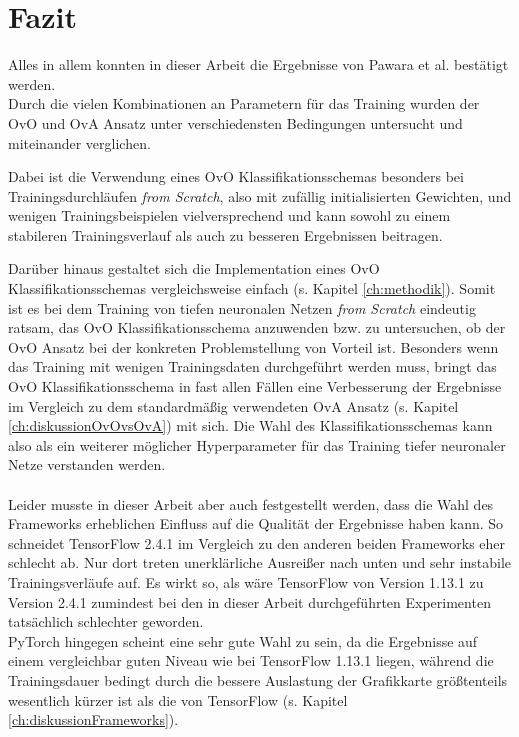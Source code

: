 \chapter{Fazit}
\label{ch:fazit}
Alles in allem konnten in dieser Arbeit die Ergebnisse von Pawara et al. \cite{pawaraPaper} bestätigt werden.\\
Durch die vielen Kombinationen an Parametern für das Training wurden der OvO und OvA Ansatz unter verschiedensten Bedingungen untersucht und miteinander verglichen.

Dabei ist die Verwendung eines OvO Klassifikationsschemas besonders bei Trainingsdurchläufen \textit{from Scratch}, also mit zufällig initialisierten Gewichten, und wenigen Trainingsbeispielen vielversprechend und kann sowohl zu einem stabileren Trainingsverlauf als auch zu besseren Ergebnissen beitragen.

Darüber hinaus gestaltet sich die Implementation eines OvO Klassifikationsschemas vergleichsweise einfach (s. Kapitel \ref{ch:methodik}). Somit ist es bei dem Training von tiefen neuronalen Netzen \textit{from Scratch} eindeutig ratsam, das OvO Klassifikationsschema anzuwenden bzw. zu untersuchen, ob der OvO Ansatz bei der konkreten Problemstellung von Vorteil ist. Besonders wenn das Training mit wenigen Trainingsdaten durchgeführt werden muss, bringt das OvO Klassifikationsschema in fast allen Fällen eine Verbesserung der Ergebnisse im Vergleich zu dem standardmäßig verwendeten OvA Ansatz (s. Kapitel \ref{ch:diskussionOvOvsOvA}) mit sich. Die Wahl des Klassifikationsschemas kann also als ein weiterer möglicher Hyperparameter für das Training tiefer neuronaler Netze verstanden werden.\\\\

Leider musste in dieser Arbeit aber auch festgestellt werden, dass die Wahl des Frameworks erheblichen Einfluss auf die Qualität der Ergebnisse haben kann. So schneidet TensorFlow 2.4.1 \cite{tensorflow} im Vergleich zu den anderen beiden Frameworks eher schlecht ab. Nur dort treten unerklärliche Ausreißer nach unten und sehr instabile Trainingsverläufe auf. Es wirkt so, als wäre TensorFlow \cite{tensorflow} von Version 1.13.1 zu Version 2.4.1 zumindest bei den in dieser Arbeit durchgeführten Experimenten tatsächlich schlechter geworden.\\
PyTorch \cite{pytorch} hingegen scheint eine sehr gute Wahl zu sein, da die Ergebnisse auf einem vergleichbar guten Niveau wie bei TensorFlow 1.13.1 \cite{tensorflow} liegen, während die Trainingsdauer bedingt durch die bessere Auslastung der Grafikkarte größtenteils wesentlich kürzer ist als die von TensorFlow \cite{tensorflow} (s. Kapitel \ref{ch:diskussionFrameworks}).\\\\

